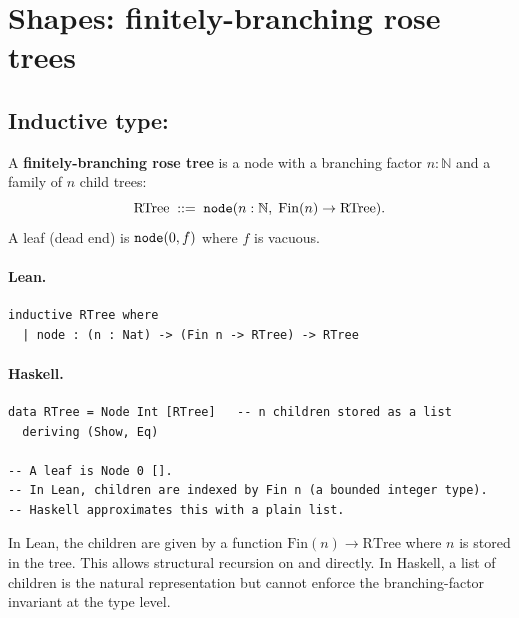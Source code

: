\documentclass[11pt,a4paper]{article}
\begin{document}
\section{Shapes: finitely-branching rose trees}

\subsection{Inductive type: }

\begin{defn}
A \textbf{finitely-branching rose tree} is a node with a branching factor
$n : \mathbb{N}$ and a family of $n$ child trees:
\[
  \mathrm{RTree} \;::=\; \texttt{node}(n : \mathbb{N},\; \mathrm{Fin}(n) \to \mathrm{RTree}).
\]
A leaf (dead end) is $\texttt{node}(0, f)$ where $f$ is vacuous.
\end{defn}

\paragraph{Lean.}
\begin{lstlisting}[style=lean]
inductive RTree where
  | node : (n : Nat) -> (Fin n -> RTree) -> RTree
\end{lstlisting}

\paragraph{Haskell.}
\begin{lstlisting}[style=haskell]
data RTree = Node Int [RTree]   -- n children stored as a list
  deriving (Show, Eq)

-- A leaf is Node 0 [].
-- In Lean, children are indexed by Fin n (a bounded integer type).
-- Haskell approximates this with a plain list.
\end{lstlisting}

\begin{fidelitynote}
In Lean, the children are given by a function $\mathrm{Fin}(n) \to \mathrm{RTree}$
where $n$ is stored in the tree.  This allows structural recursion on
 and  directly.  In Haskell, a list of children is
the natural representation but cannot enforce the branching-factor invariant
at the type level.
\end{fidelitynote}
\end{document}
